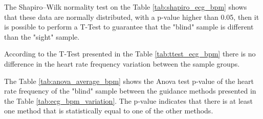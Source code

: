 
%
%    
%
%
%
%
%    
%
The Shapiro–Wilk normality test on the Table \ref{tab:shapiro_ecg_bpm} shows that these data are normally distributed, with a p-value higher than 0.05, then it is possible to perform a T-Test to guarantee that the "blind" sample is different than the "sight" sample.

%

According to the T-Test presented in the Table \ref{tab:ttest_ecg_bpm} there is no difference in the heart rate frequency variation between the sample groups.

%

\begin{table}[!htb]
    \begin{minipage}{.45\linewidth}
        
    \end{minipage}
    \hfill
    \begin{minipage}{.45\linewidth}
        \vspace{-2.75cm}
        
    \end{minipage}
\end{table}

The Table \ref{tab:anova_average_bpm} shows the Anova test p-value of the heart rate frequency of the "blind" sample between the guidance methods presented in the Table \ref{tab:ecg_bpm_variation}. The p-value indicates that there is at least one method that is statistically equal to one of the other methods.

